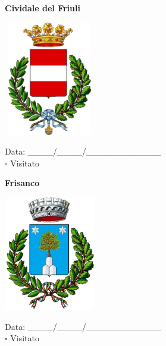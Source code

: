 \documentclass[a5paper,12pt]{article}
\begin{document}
\vspace{0.7cm}

\noindent
\begin{minipage}[t]{0.45\textwidth}
    \begin{center}
        \textbf{Cividale del Friuli}
    \end{center}
    \vspace{-0.5cm} %
    \begin{center}
        \includegraphics[height= 5cm, width=4cm]{Friuli Venezia Giulia/Cividale-del-Friuli-Stemma.png}
    \end{center}
    \vspace{-0.4cm} %
    \begin{flushleft}
        Data: \_\_\_\_/\_\_\_\_/\_\_\_\_\_\_\_\_\_\_\_\_ \\
        $\square$ Visitato
    \end{flushleft}
\end{minipage}
\hfill
\noindent
\begin{minipage}[t]{0.45\textwidth}
    \begin{center}
        \textbf{Frisanco}
    \end{center}
    \vspace{-0.5cm} %
    \begin{center}
        \includegraphics[height= 5cm, width=4cm]{Friuli Venezia Giulia/Frisanco-Stemma.png}
    \end{center}
    \vspace{-0.4cm} %
    \begin{flushleft}
        Data: \_\_\_\_/\_\_\_\_/\_\_\_\_\_\_\_\_\_\_\_\_ \\
        $\square$ Visitato
    \end{flushleft}
\end{minipage}
\end{document}
